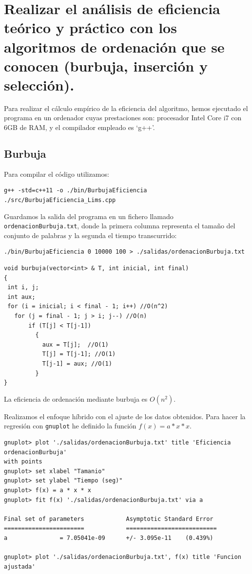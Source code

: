 \documentclass[11pt]{article}
\begin{document}
\section{Realizar el análisis de eficiencia teórico y práctico con los algoritmos de ordenación que se conocen (burbuja, inserción y selección).}

Para realizar el cálculo empírico de la eficiencia del algoritmo, hemos ejecutado el programa en un ordenador cuyas prestaciones son: procesador Intel Core i7 con 6GB de RAM, y el compilador empleado es `g++'.\\

\subsection{Burbuja}
Para compilar el código utilizamos:
\begin{verbatim}
g++ -std=c++11 -o ./bin/BurbujaEficiencia ./src/BurbujaEficiencia_Lims.cpp 
\end{verbatim}

Guardamos la salida del programa en un fichero llamado \texttt{ordenacionBurbuja.txt}, donde la primera columna representa el tamaño del conjunto de palabras y la segunda el tiempo transcurrido:
\begin{verbatim}
./bin/BurbujaEficiencia 0 10000 100 > ./salidas/ordenacionBurbuja.txt
\end{verbatim}

\begin{verbatim}
void burbuja(vector<int> & T, int inicial, int final)
{
 int i, j;
 int aux;
 for (i = inicial; i < final - 1; i++) //O(n^2)
   for (j = final - 1; j > i; j--) //O(n)
       if (T[j] < T[j-1])
         {
           aux = T[j];  //O(1)
           T[j] = T[j-1]; //O(1)
           T[j-1] = aux; //O(1)
         }
}
\end{verbatim}

La eficiencia de ordenación mediante burbuja es $O(n^2)$.

Realizamos el enfoque híbrido con el ajuste de los datos obtenidos. Para hacer la regresión con \texttt{gnuplot} he definido la función $f(x) = a * x * x$.

\begin{verbatim}
gnuplot> plot './salidas/ordenacionBurbuja.txt' title 'Eficiencia ordenacionBurbuja' 
with points
gnuplot> set xlabel "Tamanio"
gnuplot> set ylabel "Tiempo (seg)"
gnuplot> f(x) = a * x * x
gnuplot> fit f(x) './salidas/ordenacionBurbuja.txt' via a

Final set of parameters            Asymptotic Standard Error
=======================            ==========================
a               = 7.05041e-09      +/- 3.095e-11    (0.439%)

gnuplot> plot './salidas/ordenacionBurbuja.txt', f(x) title 'Funcion ajustada'
\end{verbatim}
\end{document}
